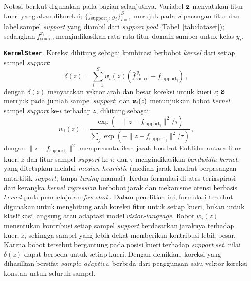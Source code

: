 \documentclass[conference]{IEEEtran}
\newcommand{\nama}[1]{\textbf{\texttt{#1}}}
\newcommand{\myparagraph}[1]{\vspace{0.2cm}\noindent\textbf{#1}.}
\begin{document}
Notasi berikut digunakan pada bagian selanjutnya. Variabel $\text{\nama{z}}$ menyatakan fitur kueri yang akan dikoreksi; $\{f_{\text{support}_i}, y_i\}_{i=1}^{S}$ merujuk pada $S$ pasangan fitur dan label sampel \textit{support} yang diambil dari \textit{support pool} (Tabel~\ref{tab:dataset}); sedangkan $\bar{f}_{\text{source}}^{y_i}$ mengindikasikan rata-rata fitur domain sumber untuk kelas $y_i$.

\myparagraph{\nama{KernelSteer}} Koreksi dihitung sebagai kombinasi berbobot \textit{kernel} dari setiap sampel \textit{support}:
\begin{equation}
\delta(z) = \sum_{i=1}^{S} w_i(z)\left(\bar{f}_{\text{source}}^{\,y_i} - f_{\text{support}_i}\right) \, ,
\tag*{}\label{eq:kernel}
\end{equation}
dengan $\delta(z)$ menyatakan vektor arah dan besar koreksi untuk kueri $z$; $\text{\nama{S}}$ merujuk pada jumlah sampel \textit{support}; dan $\text{\nama{w}}_i(z)$ menunjukkan bobot \textit{kernel} sampel \textit{support} ke-$i$ terhadap $z$, dihitung sebagai:
\begin{equation}
w_i(z) = \frac{\exp(-\lVert z-f_{\text{support}_i}\rVert^2/\tau)}{\sum_j \exp(-\lVert z-f_{\text{support}_j}\rVert^2/\tau)} \, ,
\tag*{}\label{eq:kernelweight}
\end{equation}
dengan $\lVert z-f_{\text{support}_i}\rVert^2$ merepresentasikan jarak kuadrat Euklides antara fitur kueri $z$ dan fitur sampel \textit{support} ke-$i$; dan $\tau$ mengindikasikan \textit{bandwidth kernel}, yang ditetapkan melalui \textit{median heuristic} \cite{b18} (median jarak kuadrat berpasangan antartitik \textit{support}, tanpa \textit{tuning} manual). Kedua formulasi di atas terinspirasi dari kerangka \textit{kernel regression} berbobot jarak dan mekanisme atensi berbasis \textit{kernel} pada pembelajaran \textit{few-shot} \cite{b16,b17}. Dalam penelitian ini, formulasi tersebut digunakan untuk menghitung arah koreksi fitur untuk setiap kueri, bukan untuk klasifikasi langsung atau adaptasi model \textit{vision-language}. Bobot $w_i(z)$ menentukan kontribusi setiap sampel \textit{support} berdasarkan jaraknya terhadap kueri $z$, sehingga sampel yang lebih dekat memberikan kontribusi lebih besar. Karena bobot tersebut bergantung pada posisi kueri terhadap \textit{support set}, nilai $\delta(z)$ dapat berbeda untuk setiap kueri. Dengan demikian, koreksi yang dihasilkan bersifat \textit{sample-adaptive}, berbeda dari penggunaan satu vektor koreksi konstan untuk seluruh sampel.
\end{document}
